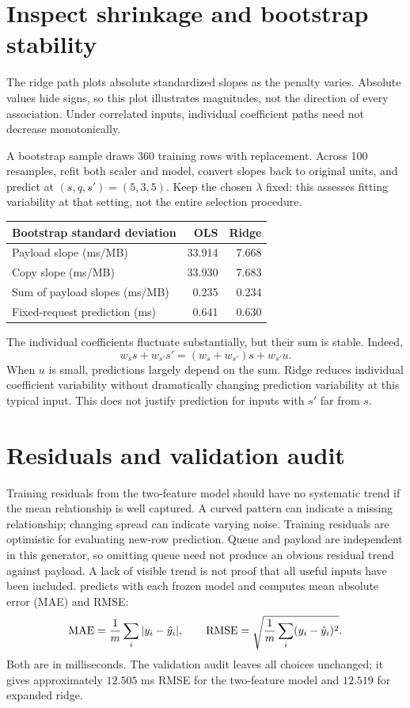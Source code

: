 \section{Inspect shrinkage and bootstrap stability}
The ridge path plots absolute standardized slopes as the penalty varies. Absolute values hide signs, so this plot illustrates magnitudes, not the direction of every association. Under correlated inputs, individual coefficient paths need not decrease monotonically.

A bootstrap sample draws 360 training rows with replacement. Across 100 resamples, refit both scaler and model, convert slopes back to original units, and predict at $(s,q,s')=(5,3,5)$. Keep the chosen $\lambda$ fixed: this assesses fitting variability at that setting, not the entire selection procedure.
\begin{center}
\begin{tabular}{lrr}\toprule
Bootstrap standard deviation & OLS & Ridge\\\midrule
Payload slope (ms/MB)&33.914&7.668\\
Copy slope (ms/MB)&33.930&7.683\\
Sum of payload slopes (ms/MB)&0.235&0.234\\
Fixed-request prediction (ms)&0.641&0.630\\\bottomrule
\end{tabular}
\end{center}
The individual coefficients fluctuate substantially, but their sum is stable. Indeed,
\[w_s s+w_{s'}s'=(w_s+w_{s'})s+w_{s'}u.\]
When $u$ is small, predictions largely depend on the sum. Ridge reduces individual coefficient variability without dramatically changing prediction variability at this typical input. This does not justify prediction for inputs with $s'$ far from $s$.

\section{Residuals and validation audit}
Training residuals from the two-feature model should have no systematic trend if the mean relationship is well captured. A curved pattern can indicate a missing relationship; changing spread can indicate varying noise. Training residuals are optimistic for evaluating new-row prediction.
Queue and payload are independent in this generator, so omitting queue need not produce an obvious residual trend against payload. A lack of visible trend is not proof that all useful inputs have been included.
 predicts with each frozen model and computes mean absolute error (MAE) and RMSE:
\[\operatorname{MAE}=\frac1m\sum_i|y_i-\hat y_i|,\qquad
\operatorname{RMSE}=\sqrt{\frac1m\sum_i(y_i-\hat y_i)^2}.\]
Both are in milliseconds. The validation audit leaves all choices unchanged; it gives approximately $12.505$ ms RMSE for the two-feature model and $12.519$ for expanded ridge.


